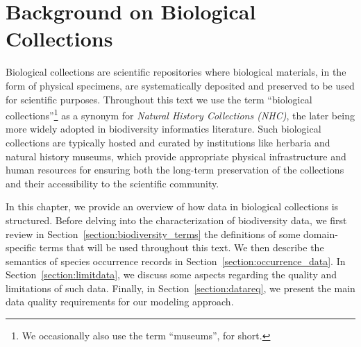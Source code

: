 \chapter{Background on Biological Collections}\label{biodiversity_data}



Biological collections are scientific repositories where biological materials, in the form of physical specimens, are systematically deposited and preserved to be used for scientific purposes. 
Throughout this text we use the term ``biological collections''\footnote{We occasionally also use the term ``museums'', for short.} as a synonym for \textit{Natural History Collections (NHC)}, the later being more widely adopted in biodiversity informatics literature.
Such biological collections are typically hosted and curated by institutions like herbaria and natural history museums, which provide appropriate physical infrastructure and human resources for ensuring both the long-term preservation of the collections and their accessibility to the scientific community.




In this chapter, we provide an overview of how data in biological collections is structured. 
Before delving into the characterization of biodiversity data, we first review in Section~\ref{section:biodiversity_terms} the definitions of some domain-specific terms that will be used throughout this text. We then describe the semantics of species occurrence records in Section~\ref{section:occurrence_data}.
In Section~\ref{section:limitdata}, we discuss some aspects regarding the quality and limitations of such data. 
Finally, in Section~\ref{section:datareq}, we present the main data quality requirements for our modeling approach.
 
